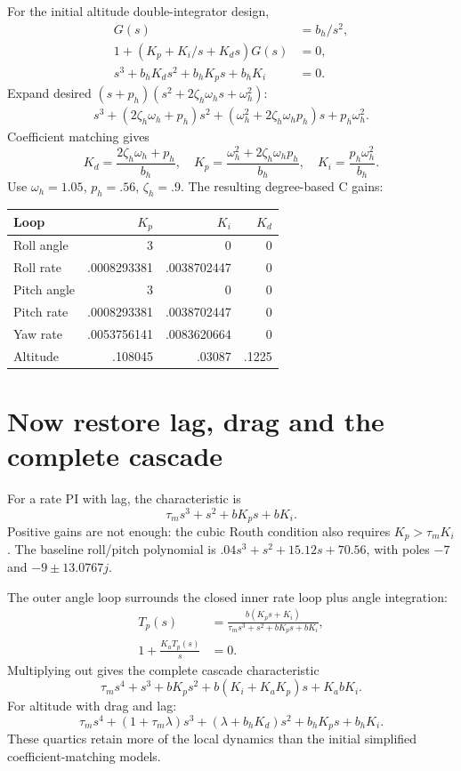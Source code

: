 For the initial altitude double-integrator design,
\begin{align}
G(s)&=b_h/s^2,\\
1+\left(K_p+K_i/s+K_ds\right)G(s)&=0,\\
s^3+b_hK_ds^2+b_hK_ps+b_hK_i&=0.
\end{align}
Expand desired $(s+p_h)(s^2+2\zeta_h\omega_hs+\omega_h^2)$:
\begin{align}
s^3+(2\zeta_h\omega_h+p_h)s^2
+(\omega_h^2+2\zeta_h\omega_hp_h)s+p_h\omega_h^2.
\end{align}
Coefficient matching gives
\begin{equation}
K_d=\frac{2\zeta_h\omega_h+p_h}{b_h},\quad
K_p=\frac{\omega_h^2+2\zeta_h\omega_hp_h}{b_h},\quad
K_i=\frac{p_h\omega_h^2}{b_h}.
\end{equation}
Use $\omega_h=1.05$, $p_h=.56$, $\zeta_h=.9$. The resulting degree-based C gains:
\begin{center}
\begin{tabular}{@{}lrrr@{}}\toprule
Loop & $K_p$ & $K_i$ & $K_d$\\\midrule
Roll angle & 3 & 0 & 0\\
Roll rate & .0008293381 & .0038702447 & 0\\
Pitch angle & 3 & 0 & 0\\
Pitch rate & .0008293381 & .0038702447 & 0\\
Yaw rate & .0053756141 & .0083620664 & 0\\
Altitude & .108045 & .03087 & .1225\\\bottomrule
\end{tabular}
\end{center}

\section{Now restore lag, drag and the complete cascade}
For a rate PI with lag, the characteristic is
\begin{equation}
\tau_ms^3+s^2+bK_ps+bK_i.
\end{equation}
Positive gains are not enough: the cubic Routh condition also requires
$K_p>\tau_mK_i$. The baseline roll/pitch polynomial is
$.04s^3+s^2+15.12s+70.56$, with poles $-7$ and $-9\pm13.0767j$.

The outer angle loop surrounds the closed inner rate loop plus angle integration:
\begin{align}
T_p(s)&=\frac{b(K_ps+K_i)}{\tau_ms^3+s^2+bK_ps+bK_i},\\
1+\frac{K_aT_p(s)}s&=0.
\end{align}
Multiplying out gives the complete cascade characteristic
\begin{equation}
\tau_ms^4+s^3+bK_ps^2+b(K_i+K_aK_p)s+K_abK_i.
\end{equation}
For altitude with drag and lag:
\begin{equation}
\tau_ms^4+(1+\tau_m\lambda)s^3+(\lambda+b_hK_d)s^2+b_hK_ps+b_hK_i.
\end{equation}
These quartics retain more of the local dynamics than the initial simplified
coefficient-matching models.

